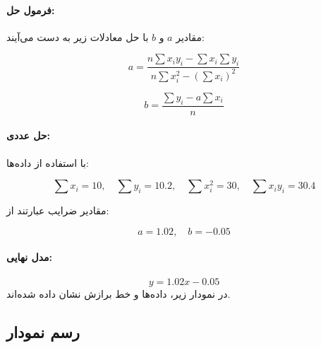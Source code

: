 \begin{solution}
	\paragraph{فرمول حل:}
	مقادیر \(a\) و \(b\) با حل معادلات زیر به دست می‌آیند:
	
	\[
	a = \frac{n \sum x_i y_i - \sum x_i \sum y_i}{n \sum x_i^2 - (\sum x_i)^2}
	\]
	
	\[
	b = \frac{\sum y_i - a \sum x_i}{n}
	\]
	
	\paragraph{حل عددی:}
	با استفاده از داده‌ها:
	
	\[
	\sum x_i = 10, \quad \sum y_i = 10.2, \quad \sum x_i^2 = 30, \quad \sum x_i y_i = 30.4
	\]
	
	مقادیر ضرایب عبارتند از:
	
	\[
	a = 1.02, \quad b = -0.05
	\]
	
	\paragraph{مدل نهایی:}
	\[
	y = 1.02x - 0.05
	\]
	در نمودار زیر، داده‌ها و خط برازش نشان داده شده‌اند.
	
	\begin{center}
	\end{center}
\end{solution}
\subsection{رسم نمودار}
